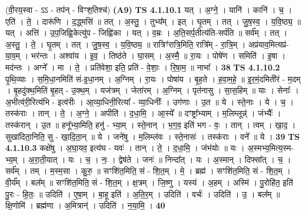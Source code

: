 \documentclass[17pt]{extarticle}
\begin{document}
                      (वी॒रय॒स्वा - ऽऽ - तप॑न् - विꣳश॒तिश्च॑)  \textbf{(A9)} \newline \newline
                                \textbf{ TS 4.1.10.1} \newline
                  यत् । अ॒ग्ने॒ । यानि॑ । कानि॑ । च॒ । एति॑ । ते॒ । दारू॑णि । द॒द्ध्मसि॑ ॥ तत् । अ॒स्तु॒ । तुभ्य᳚म् । इत् । घृ॒तम् । तत् । जु॒ष॒स्व॒ । य॒वि॒ष्ठ्य॒ ॥ यत् । अत्ति॑ । उ॒प॒जिह्वि॒केत्यु॑प - जिह्वि॑का । यत् । व॒म्रः । अ॒ति॒सर्प॒तीत्य॑ति-सर्प॑ति ॥ सर्व᳚म् । तत् । अ॒स्तु॒ । ते॒ । घृ॒तम् । तत् । जु॒ष॒स्व॒ । य॒वि॒ष्ठ्य॒ ॥ रात्रिꣳ॑रात्रि॒मिति॒ रात्रि᳚म् - रा॒त्रि॒म् । अप्र॑याव॒मित्यप्र॑-या॒व॒म् । भर॑न्तः । अश्वा॑य । इ॒व॒ । तिष्ठ॑ते । घा॒सम् । अ॒स्मै॒ ॥ रा॒यः । पोषे॑ण । समिति॑ । इ॒षा । मद॑न्तः । अग्ने᳚ । मा । ते॒ । प्रति॑वेशा॒ इति॒ प्रति॑ - वे॒शाः॒ । रि॒षा॒म॒ ॥ नाभा᳚ । \textbf{  38 } \newline
                  \newline
                                \textbf{ TS 4.1.10.2} \newline
                  पृ॒थि॒व्याः । स॒मि॒धा॒नमिति॑ सं-इ॒धा॒नम् । अ॒ग्निम् । रा॒यः । पोषा॑य । बृ॒ह॒ते । ह॒वा॒म॒हे॒ ॥ इ॒र॒मं॒दमिती॑रं - म॒दम् । बृ॒हदु॑क्थ॒मिति॑ बृ॒हत् - उ॒क्थ॒म् । यज॑त्रम् । जेता॑रम् । अ॒ग्निम् । पृत॑नासु । सा॒स॒हिम् ॥ याः । सेनाः᳚ । अ॒भीत्व॑री॒रित्य॑भि - इत्व॑रीः । आ॒व्या॒धिनी॒रित्या᳚ - व्या॒धिनीः᳚ । उग॑णाः । उ॒त ॥ ये । स्ते॒नाः । ये । च॒ । तस्क॑राः । तान् । ते॒ । अ॒ग्ने॒ । अपीति॑ । द॒धा॒मि॒ । आ॒स्ये᳚ ॥ दꣳष्ट्रा᳚भ्याम् । म॒लिम्लून्न्॑ । जंभ्यैः᳚ । तस्क॑रान् । उ॒त ॥ हनू᳚भ्या॒मिति॒ हनु॑ - भ्या॒म् । स्ते॒नान् । भ॒ग॒व॒ इति॑ भग - वः॒ । तान् । त्वम् । खा॒द॒ । सुखा॑दिता॒निति॒ सु - खा॒दि॒ता॒न् ॥ ये । जने॑षु । म॒लिम्ल॑वः । स्ते॒नासः॑ । तस्क॑राः । वने᳚ ॥ ये । \textbf{  39} \newline
                  \newline
                                \textbf{ TS 4.1.10.3} \newline
                  कक्षे॑षु । अ॒घा॒यव॒ इत्य॑घ - यवः॑ । तान् । ते॒ । द॒धा॒मि॒ । जंभ॑योः ॥ यः । अ॒स्मभ्य॒मित्य॒स्म-भ्य॒म् । अ॒रा॒ती॒यात् । यः । च॒ । नः॒ । द्वेष॑ते । जनः॑ ॥ निन्दा᳚त् । यः । अ॒स्मान् । दिफ्सा᳚त् । च॒ । सर्व᳚म् । तम् । म॒स्म॒सा । कु॒रु॒ ॥ सꣳशि॑त॒मिति॒ सं - शि॒त॒म् । मे॒ । ब्रह्म॑ । सꣳशि॑त॒मिति॒ सं - शि॒त॒म् । वी॒र्य᳚म् । बल᳚म् ॥ सꣳशि॑त॒मिति॒ सं - शि॒त॒म् । क्ष॒त्रम् । जि॒ष्णु । यस्य॑ । अ॒हम् । अस्मि॑ । पु॒रोहि॑त॒ इति॑ पु॒रः - हि॒तः॒ ॥ उदिति॑ । ए॒षा॒म् । बा॒हू इति॑ । अ॒ति॒र॒म् । उदिति॑ । वर्चः॑ । उदिति॑ । उ॒ । बल᳚म् ॥ क्षि॒णोमि॑ । ब्रह्म॑णा । अ॒मित्रान्॑ । उदिति॑ । न॒या॒मि॒ । \textbf{  40} \newline
\end{document}
